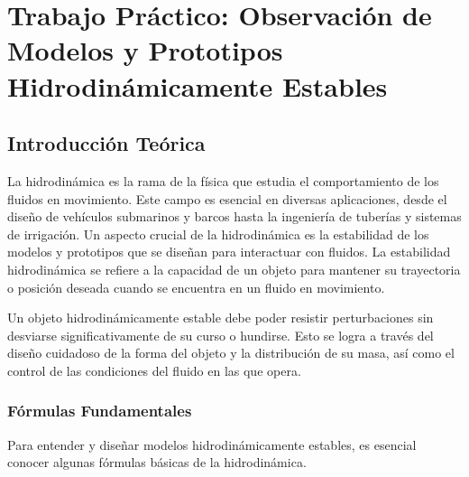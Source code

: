 \documentclass[../main]{subfiles}
\begin{document}
\chapter{Trabajo Práctico: Observación de Modelos y Prototipos Hidrodinámicamente Estables}


\section{Introducción Teórica}

La hidrodinámica es la rama de la física que estudia el comportamiento de los fluidos en movimiento. Este campo es esencial en diversas aplicaciones, desde el diseño de vehículos submarinos y barcos hasta la ingeniería de tuberías y sistemas de irrigación. Un aspecto crucial de la hidrodinámica es la estabilidad de los modelos y prototipos que se diseñan para interactuar con fluidos. La estabilidad hidrodinámica se refiere a la capacidad de un objeto para mantener su trayectoria o posición deseada cuando se encuentra en un fluido en movimiento.

Un objeto hidrodinámicamente estable debe poder resistir perturbaciones sin desviarse significativamente de su curso o hundirse. Esto se logra a través del diseño cuidadoso de la forma del objeto y la distribución de su masa, así como el control de las condiciones del fluido en las que opera.

\subsection{Fórmulas Fundamentales}

Para entender y diseñar modelos hidrodinámicamente estables, es esencial conocer algunas fórmulas básicas de la hidrodinámica.

\end{document}

